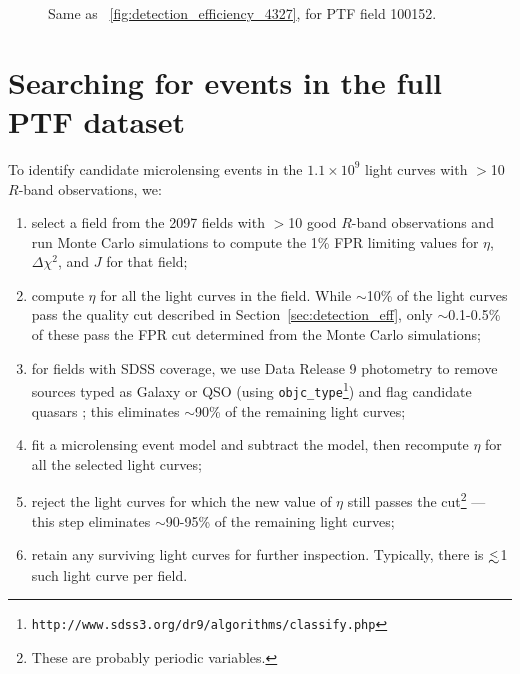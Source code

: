\documentclass{emulateapj}
\newcommand{\lapprox }{{\lower0.8ex\hbox{$\buildrel <\over\sim$}}}
\begin{document}
\begin{figure}
\centering
	
\caption{Same as \figurename~\ref{fig:detection_efficiency_4327}, for PTF field 100152.}\label{fig:detection_efficiency_100152}
\end{figure}

\section{Searching for events in the full PTF dataset}\label{sec:search}
To identify candidate microlensing events in the $1.1\times10^9$ light curves with $>$10 $R$-band observations, we:
\begin{enumerate}
	\item select a field from the 2097 fields with $>$10 good $R$-band observations and run Monte Carlo simulations to compute the 1\% FPR limiting values for $\eta$, $\Delta \chi^2$, and $J$ for that field;
	\item compute $\eta$ for all the light curves in the field. While $\sim$10\% of the light curves pass the quality cut described in Section~\ref{sec:detection_eff}, only $\sim$0.1-0.5\% of these pass the FPR cut determined from the Monte Carlo simulations;
	\item for fields with SDSS coverage, we use Data Release 9 photometry \citep{dr9paper} to remove sources typed as Galaxy or QSO (using \texttt{objc\_type}\footnote{{\tt http://www.sdss3.org/dr9/algorithms/classify.php}}) and flag candidate quasars \citep[using the cuts described in][]{richards02}; this eliminates $\sim$90\% of the remaining light curves;
	\item fit a microlensing event model and subtract the model, then recompute $\eta$ for all the selected light curves;
	\item reject the light curves for which the new value of $\eta$ still passes the cut\footnote{These are probably periodic variables.} --- this step eliminates $\sim$90-95\% of the remaining light curves;
	\item retain any surviving light curves for further inspection. Typically, there is $\lapprox$1 such light curve per field.
\end{enumerate}
\end{document}
